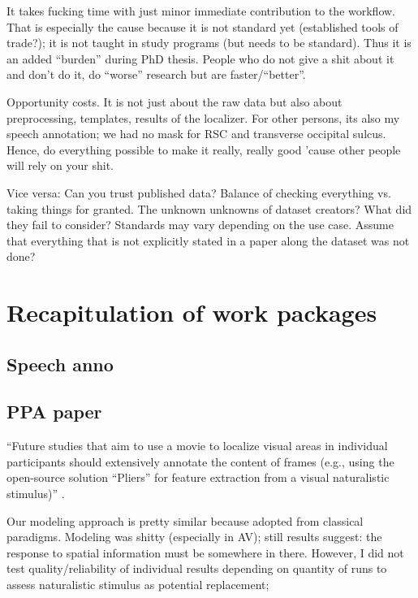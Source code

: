 %
It takes fucking time with just minor immediate contribution to the workflow.
%
That is especially the cause because it is not standard yet (established tools
of trade?); it is not taught in study programs (but needs to be standard).
Thus it is an added ``burden'' during PhD thesis.
%
People who do not give a shit about it and don't do it, do ``worse'' research
but are faster/``better''.

%
Opportunity costs. It is not just about the raw data but also about
preprocessing, templates, results of the localizer. For other persons, its also
my speech annotation; we had no mask for RSC and transverse occipital sulcus.
%
Hence, do everything possible to make it really, really good 'cause other people
will rely on your shit.

%
Vice versa: Can you trust published data? Balance of checking everything vs.
taking things for granted.
%
The unknown unknowns of dataset creators? What did they fail to consider?
Standards may vary depending on the use case. Assume that everything that is not
explicitly stated in a paper along the dataset was not done?


\section{Recapitulation of work packages}



\subsection{Speech anno}



\subsection{PPA paper}


%
``Future studies that aim to use a movie to localize visual areas in individual
participants should extensively annotate the content of frames (e.g., using the
open-source solution ``Pliers''\citep{mcnamara2017developing} for feature
extraction from a visual naturalistic stimulus)''
\citep{haeusler2022processing}.

%
Our modeling approach is pretty similar because adopted from classical
paradigms.
%
Modeling was shitty (especially in AV);
%
still results suggest: the response to spatial information must be somewhere in
there.
%
However, I did not test quality/reliability of individual results depending on
quantity of runs to assess naturalistic stimulus as potential replacement;


